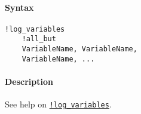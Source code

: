 


	\paragraph{Syntax}\label{syntax}

\begin{verbatim}
!log_variables
    !all_but
    VariableName, VariableName, 
    VariableName, ...
\end{verbatim}

\paragraph{Description}\label{description}

See help on \href{modellang/logvariables}{\texttt{!log\_variables}}.


